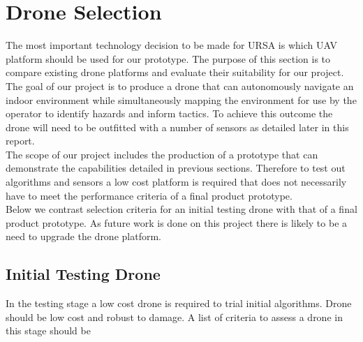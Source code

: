 \documentclass[capstone_report.tex]{subfiles}
\begin{document}
\section{Drone Selection}
The most important technology decision to be made for URSA is which UAV platform should be used for our prototype. The purpose of this section is to compare existing drone platforms and evaluate their suitability for our project.\\

The goal of our project is to produce a drone that can autonomously navigate an indoor environment while simultaneously mapping the environment for use by the operator to identify hazards and inform tactics.  To achieve this outcome the drone will need to be outfitted with a number of sensors as detailed later in this report.\\

The scope of our project includes the production of a prototype that can demonstrate the capabilities detailed in previous sections.  Therefore to test out algorithms and sensors a low cost platform is required that does not necessarily have to meet the performance criteria of a final product prototype.\\

Below we contrast selection criteria for an initial testing drone with that of a final product prototype.  As future work is done on this project there is likely to be a need to upgrade the drone platform.

\subsection{Initial Testing Drone}
In the testing stage a low cost drone is required to trial initial algorithms.  Drone should be low cost and robust to damage.  A list of criteria to assess a drone in this stage should be
\end{document}
